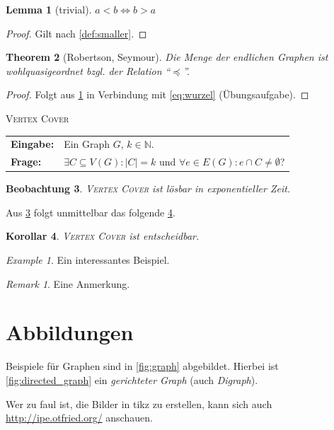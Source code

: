 \documentclass[a4paper,titlepage,onecolumn,twoside,12pt,ngerman,titlepage=firstiscover]{scrbook}
\makeatletter
\theoremstyle{plain} %
\newtheorem{theorem}{Theorem}[chapter]
\newtheorem{lemma}[theorem]{Lemma}
\newtheorem{corollary}[theorem]{Korollar}
\newtheorem{observation}[theorem]{Beobachtung}
\theoremstyle{definition} %
\theoremstyle{remark} %
\newtheorem{example}{Example}
\newtheorem*{remark}{Remark}
\theoremstyle{plain}
\newcommand{\problemdef}[3]{
  \begin{center}
    \begin{minipage}{0.95\textwidth}
      \noindent
      \textsc{#1}
      
      \vspace{2pt}
      \setlength{\tabcolsep}{3pt}
      \begin{tabularx}{\textwidth}{@{}lX@{}}
        \textbf{Eingabe:} 		& #2 \\
        \textbf{Frage:} 	& #3
      \end{tabularx}
    \end{minipage}
  \end{center}
}
\newcommand{\NN}{\mathbb{N}} %
\newcommand\abs[1]{\left|#1\right|} %
\makeatother
\begin{document}
\begin{lemma}[trivial]\label{thm:trivial}
	$a < b \iff b > a$
\end{lemma}
\begin{proof}
Gilt nach \cref{def:smaller}.
\end{proof}

\begin{theorem}[Robertson, Seymour]
Die Menge der endlichen Graphen ist wohlquasigeordnet bzgl. der Relation \enquote{$\preceq$}.
\end{theorem}
\begin{proof}
Folgt aus \cref{thm:trivial} in Verbindung mit \cref{eq:wurzel} (Übungsaufgabe).
\end{proof}

\newcommand{\vertexcover}{\textsc{Vertex Cover}}
\problemdef{\vertexcover{}}
	{Ein Graph $G$, $k \in \NN$.}
	{$\exists C \subseteq V(G) : \abs{C} = k$ und $\forall e \in E(G): e \cap C \neq \emptyset$?}

\begin{observation}\label{thm:exponentialzeit}
\textsc{\vertexcover{}} ist lösbar in exponentieller Zeit.
\end{observation}

Aus \cref{thm:exponentialzeit} folgt unmittelbar das folgende \cref{thm:entscheidbar}.

\begin{corollary}\label{thm:entscheidbar}
\textsc{\vertexcover{}} ist entscheidbar.
\end{corollary}

\begin{example}
Ein interessantes Beispiel.
\end{example}

\begin{remark}
Eine Anmerkung.
\end{remark}


\section{Abbildungen}

Beispiele für Graphen sind in \cref{fig:graph} abgebildet.
Hierbei ist \cref{fig:directed_graph} ein \textit{gerichteter Graph} (auch \textit{Digraph}).

Wer zu faul ist, die Bilder in tikz zu erstellen, kann sich auch \url{http://ipe.otfried.org/} anschauen.
\end{document}
